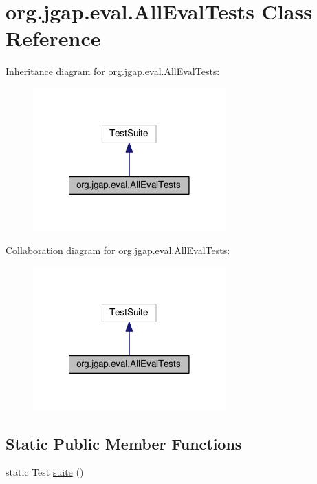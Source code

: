 \hypertarget{classorg_1_1jgap_1_1eval_1_1_all_eval_tests}{\section{org.\-jgap.\-eval.\-All\-Eval\-Tests Class Reference}
\label{classorg_1_1jgap_1_1eval_1_1_all_eval_tests}
}


Inheritance diagram for org.\-jgap.\-eval.\-All\-Eval\-Tests\-:
\nopagebreak
\begin{figure}[H]
\begin{center}
\leavevmode
\includegraphics[width=210pt]{classorg_1_1jgap_1_1eval_1_1_all_eval_tests__inherit__graph}
\end{center}
\end{figure}


Collaboration diagram for org.\-jgap.\-eval.\-All\-Eval\-Tests\-:
\nopagebreak
\begin{figure}[H]
\begin{center}
\leavevmode
\includegraphics[width=210pt]{classorg_1_1jgap_1_1eval_1_1_all_eval_tests__coll__graph}
\end{center}
\end{figure}
\subsection*{Static Public Member Functions}
\begin{DoxyCompactItemize}
\item 
static Test \hyperlink{classorg_1_1jgap_1_1eval_1_1_all_eval_tests_a13cd6209ed66cdfa25e353718b33b3a2}{suite} ()
\end{DoxyCompactItemize}
